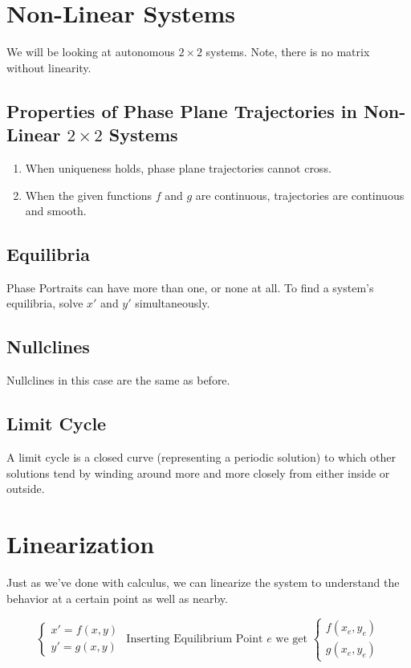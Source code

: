 \section{Non-Linear Systems}
We will be looking at autonomous $2 \times 2$ systems. Note, there is no matrix without linearity.

    \subsection{Properties of Phase Plane Trajectories in Non-Linear $2 \times 2$ Systems}
    \begin{enumerate}
        \item When uniqueness holds, phase plane trajectories cannot cross.
        \item When the given functions $f$ and $g$ are continuous, trajectories are continuous and smooth.
    \end{enumerate}

    \subsection{Equilibria}
    Phase Portraits can have more than one, or none at all. To find a system's equilibria, solve $x\prime$ and $y\prime$ simultaneously.

    \subsection{Nullclines}
    Nullclines in this case are the same as before.

    \subsection{Limit Cycle}
    A limit cycle is a closed curve (representing a periodic solution) to which other solutions tend by winding around more and more closely from either inside or outside.

\section{Linearization}
Just as we've done with calculus, we can linearize the system to understand the behavior at a certain point as well as nearby.

    \[
        \begin{cases}
            x\prime = f(x, y)\\
            y\prime = g(x, y)
        \end{cases}
        \text{ Inserting Equilibrium Point } e \text{ we get }
        \begin{cases}
            f(x_e, y_e)\\
            g(x_e, y_e)
        \end{cases}
    \]


